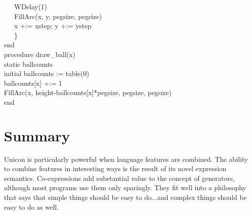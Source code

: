 {\>   \ \ \ WDelay(1) \\
\>   \ \ \ FillArc(x, y, pegsize, pegsize) \\
\>   \ \ \ x +:= xstep; y +:= ystep \\
\>   \ \ \ \} \\
end
\ \\
procedure draw\_ball(x) \\
static ballcounts \\
initial ballcounts := table(0) \\
\>   ballcounts[x] +:= 1 \\
\>   FillArc(x, height-ballcounts[x]*pegsize, pegsize, pegsize) \\
end
}

\section*{Summary}

Unicon is particularly powerful when language features are
combined. The ability to combine features in interesting ways is the
result of its novel expression semantics. Co-expressions add
substantial value to the concept of generators,
although most programs use them only sparingly. They fit well into a
philosophy that says that simple things should be easy to do...and
complex things should be easy to do as well.

